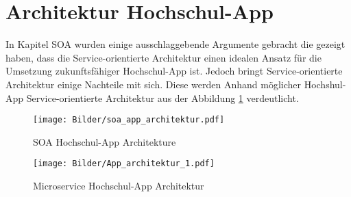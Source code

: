 \section{Architektur Hochschul-App}
\label{sec:architektur}
In Kapitel SOA wurden einige ausschlaggebende Argumente gebracht die gezeigt haben, dass die Service-orientierte Architektur einen idealen Ansatz für die Umsetzung zukunftsfähiger Hochschul-App ist. Jedoch bringt Service-orientierte Architektur einige Nachteile mit sich. Diese werden Anhand möglicher Hochshul-App Service-orientierte Architektur aus der Abbildung \ref{fig:soaarch} verdeutlicht.

\begin{figure}[H]
\centering
\texttt{[image: Bilder/soa\_app\_architektur.pdf]}
\caption{SOA Hochschul-App Architekture\label{fig:soaarch}}
\end{figure}

\begin{figure}[H]
\centering
\texttt{[image: Bilder/App\_architektur\_1.pdf]}
\caption{Microservice Hochschul-App Architektur\label{fig:architektur_app}}
\end{figure}